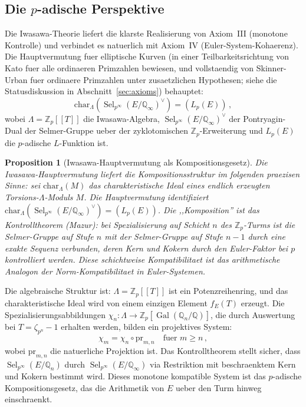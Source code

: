 \documentclass[aps,prd,twocolumn,superscriptaddress,nofootinbib]{revtex4-2}
\newtheorem{proposition}[theorem]{Proposition}
\theoremstyle{definition}
\theoremstyle{remark}
\DeclareMathOperator{\Sel}{Sel}
\DeclareMathOperator{\Gal}{Gal}
\begin{document}
\subsection{Die $p$-adische Perspektive}

Die Iwasawa-Theorie liefert die klarste Realisierung von Axiom~III (monotone Kontrolle) und verbindet es natuerlich mit Axiom~IV (Euler-System-Kohaerenz). Die Hauptvermutung fuer elliptische Kurven \cite{Kato2004,SkinnerUrban2014} (in einer Teilbarkeitsrichtung von Kato fuer alle ordinaeren Primzahlen bewiesen, und vollstaendig von Skinner-Urban fuer ordinaere Primzahlen unter zusaetzlichen Hypothesen; siehe die Statusdiskussion in Abschnitt~\ref{sec:axioms}) behauptet:
\begin{equation}
\mathrm{char}_{\Lambda}\!\left(\Sel_{p^\infty}(E/\mathbb{Q}_\infty)^\vee\right) = (L_p(E))\,,
\label{eq:iwasawa_mc}
\end{equation}
wobei $\Lambda = \mathbb{Z}_p[[T]]$ die Iwasawa-Algebra, $\Sel_{p^\infty}(E/\mathbb{Q}_\infty)^\vee$ der Pontryagin-Dual der Selmer-Gruppe ueber der zyklotomischen $\mathbb{Z}_p$-Erweiterung und $L_p(E)$ die $p$-adische $L$-Funktion ist.

\begin{proposition}[Iwasawa-Hauptvermutung als Kompositionsgesetz]
\label{prop:iwasawa_composition}
Die Iwasawa-Hauptvermutung liefert die Kompositionsstruktur im folgenden praezisen Sinne: sei $\mathrm{char}_\Lambda(M)$ das charakteristische Ideal eines endlich erzeugten Torsions-$\Lambda$-Moduls $M$. Die Hauptvermutung identifiziert $\mathrm{char}_\Lambda(\Sel_{p^\infty}(E/\mathbb{Q}_\infty)^\vee) = (L_p(E))$. Die ,,Komposition'' ist das Kontrolltheorem (Mazur): bei Spezialisierung auf Schicht $n$ des $\mathbb{Z}_p$-Turms ist die Selmer-Gruppe auf Stufe $n$ mit der Selmer-Gruppe auf Stufe $n-1$ durch eine exakte Sequenz verbunden, deren Kern und Kokern durch den Euler-Faktor bei $p$ kontrolliert werden. Diese schichtweise Kompatibilitaet ist das arithmetische Analogon der Norm-Kompatibilitaet in Euler-Systemen.
\end{proposition}

Die algebraische Struktur ist: $\Lambda = \mathbb{Z}_p[[T]]$ ist ein Potenzreihenring, und das charakteristische Ideal wird von einem einzigen Element $f_E(T)$ erzeugt. Die Spezialisierungsabbildungen $\chi_n: \Lambda \to \mathbb{Z}_p[\Gal(\mathbb{Q}_n/\mathbb{Q})]$, die durch Auswertung bei $T = \zeta_{p^n} - 1$ erhalten werden, bilden ein projektives System:
\begin{equation}
\chi_m = \chi_n \circ \mathrm{pr}_{m,n} \quad \text{fuer } m \geq n\,,
\end{equation}
wobei $\mathrm{pr}_{m,n}$ die natuerliche Projektion ist. Das Kontrolltheorem stellt sicher, dass $\Sel_{p^\infty}(E/\mathbb{Q}_n)$ durch $\Sel_{p^\infty}(E/\mathbb{Q}_\infty)$ via Restriktion mit beschraenktem Kern und Kokern bestimmt wird. Dieses monotone kompatible System ist das $p$-adische Kompositionsgesetz, das die Arithmetik von $E$ ueber den Turm hinweg einschraenkt.
\end{document}
